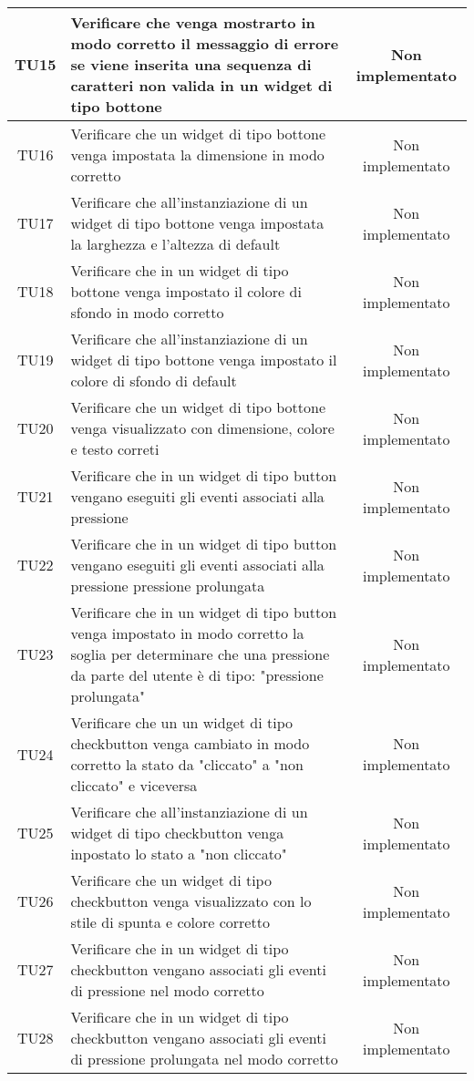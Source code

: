 \begin{center}
\begin{longtable}{|c|>{\centering}m{10cm}|c|}
		TU15 & Verificare che venga mostrarto in modo corretto il messaggio di errore se viene inserita una sequenza di caratteri non valida in un widget di tipo bottone & Non implementato \\ \hline
		TU16 & Verificare che un widget di tipo bottone venga impostata la dimensione in modo corretto & Non implementato \\ \hline
		TU17 & Verificare che all'instanziazione di un widget di tipo bottone venga impostata la larghezza e l'altezza di default & Non implementato \\ \hline
		TU18 & Verificare che in un widget di tipo bottone venga impostato il colore di sfondo in modo corretto & Non implementato \\ \hline
		TU19 & Verificare che all'instanziazione di un widget di tipo bottone venga impostato il colore di sfondo di default & Non implementato \\ \hline
		TU20 & Verificare che un widget di tipo bottone venga visualizzato con dimensione, colore e testo correti & Non implementato \\ \hline
		TU21 & Verificare che in un widget di tipo button vengano eseguiti gli eventi associati alla pressione & Non implementato \\ \hline
		TU22 & Verificare che in un widget di tipo button vengano eseguiti gli eventi associati alla pressione pressione prolungata & Non implementato \\ \hline
		TU23 & Verificare che in un widget di tipo button venga impostato in modo corretto la soglia per determinare che una pressione da parte del utente è di tipo: "pressione prolungata" & Non implementato \\ \hline
		TU24 & Verificare che un un widget di tipo checkbutton venga cambiato in modo corretto la stato da "cliccato" a "non cliccato" e viceversa & Non implementato \\ \hline
		TU25 & Verificare che all'instanziazione di un widget di tipo checkbutton venga inpostato lo stato a "non cliccato" & Non implementato \\ \hline
		TU26 & Verificare che un widget di tipo checkbutton venga visualizzato con lo stile di spunta e colore corretto & Non implementato \\ \hline
		TU27 & Verificare che in un widget di tipo checkbutton vengano associati gli eventi di pressione nel modo corretto & Non implementato \\ \hline
		TU28 & Verificare che in un widget di tipo checkbutton vengano associati gli eventi di pressione prolungata nel modo corretto & Non implementato \\ \hline

\end{longtable}
\end{center}
